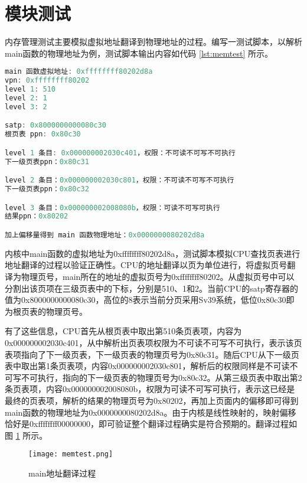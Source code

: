 \section{模块测试}

内存管理测试主要模拟虚拟地址翻译到物理地址的过程。编写一测试脚本，以解析main函数的物理地址为例，测试脚本输出内容如代码 \ref{lst:memtest} 所示。

\begin{minipage}[c]{0.95\textwidth}
\begin{lstlisting}[language={C}, caption={main函数地址翻译}, label={lst:memtest}]
main 函数虚拟地址: 0xffffffff80202d8a
vpn: 0xffffffff80202
level 1: 510
level 2: 1
level 3: 2

satp: 0x8000000000080c30
根页表 ppn: 0x80c30

level 1 条目: 0x000000002030c401，权限：不可读不可写不可执行
下一级页表ppn：0x80c31

level 2 条目：0x000000002030c801，权限：不可读不可写不可执行
下一级页表ppn：0x80c32

level 3 条目：0x000000002008080b，权限：可读不可写可执行
结果ppn：0x80202

加上偏移量得到 main 函数物理地址：0x0000000080202d8a
\end{lstlisting}
\end{minipage}

内核中main函数的虚拟地址为0xffffffff80202d8a，测试脚本模拟CPU查找页表进行地址翻译的过程以验证正确性。CPU的地址翻译以页为单位进行，将虚拟页号翻译为物理页号，main所在的地址的虚拟页号为0xffffffff80202。从虚拟页号中可以分割出该页项在三级页表中的下标，分别是510、1和2。当前CPU的satp寄存器的值为0x8000000000080c30，高位的8表示当前分页采用Sv39系统，低位0x80c30即为根页表的物理页号。

有了这些信息，CPU首先从根页表中取出第510条页表项，内容为0x000000002030c401，从中解析出页表项权限为不可读不可写不可执行，表示该页表项指向了下一级页表，下一级页表的物理页号为0x80c31。随后CPU从下一级页表中取出第1条页表项，内容0x000000002030c801，解析后的权限同样是不可读不可写不可执行，指向的下一级页表的物理页号为0x80c32。从第三级页表中取出第2条页表项，内容0x000000002008080b，权限为可读不可写可执行，表示这已经是最终的页表项，解析的结果的物理页号为0x80202，再加上页面内的偏移即可得到main函数的物理地址为0x0000000080202d8a。由于内核是线性映射的，映射偏移恰好是0xffffffff00000000，即可验证整个翻译过程确实是符合预期的。翻译过程如图 \ref{pic:memtest} 所示。

\begin{figure}[htpb]
	\centering
	\texttt{[image: memtest.png]}
	\setlength{\abovecaptionskip}{2pt}
	\caption{main地址翻译过程}
	\label{pic:memtest}
\end{figure}